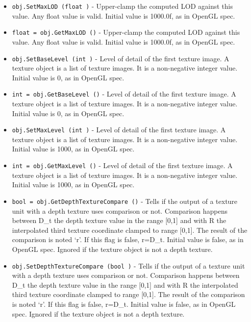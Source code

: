 \begin{itemize}
\item  \verb|obj.SetMaxLOD (float )| -  Upper-clamp the computed LOD against this value. Any float value is valid.
 Initial value is 1000.0f, as in OpenGL spec.

\item  \verb|float = obj.GetMaxLOD ()| -  Upper-clamp the computed LOD against this value. Any float value is valid.
 Initial value is 1000.0f, as in OpenGL spec.

\item  \verb|obj.SetBaseLevel (int )| -  Level of detail of the first texture image. A texture object is a list of
 texture images. It is a non-negative integer value.
 Initial value is 0, as in OpenGL spec.

\item  \verb|int = obj.GetBaseLevel ()| -  Level of detail of the first texture image. A texture object is a list of
 texture images. It is a non-negative integer value.
 Initial value is 0, as in OpenGL spec.

\item  \verb|obj.SetMaxLevel (int )| -  Level of detail of the first texture image. A texture object is a list of
 texture images. It is a non-negative integer value.
 Initial value is 1000, as in OpenGL spec.

\item  \verb|int = obj.GetMaxLevel ()| -  Level of detail of the first texture image. A texture object is a list of
 texture images. It is a non-negative integer value.
 Initial value is 1000, as in OpenGL spec.

\item  \verb|bool = obj.GetDepthTextureCompare ()| -  Tells if the output of a texture unit with a depth texture uses
 comparison or not.
 Comparison happens between D\_t the depth texture value in the range [0,1]
 and with R the interpolated third texture coordinate clamped to range
 [0,1]. The result of the comparison is noted `r'. If this flag is false,
 r=D\_t.
 Initial value is false, as in OpenGL spec.
 Ignored if the texture object is not a depth texture.

\item  \verb|obj.SetDepthTextureCompare (bool )| -  Tells if the output of a texture unit with a depth texture uses
 comparison or not.
 Comparison happens between D\_t the depth texture value in the range [0,1]
 and with R the interpolated third texture coordinate clamped to range
 [0,1]. The result of the comparison is noted `r'. If this flag is false,
 r=D\_t.
 Initial value is false, as in OpenGL spec.
 Ignored if the texture object is not a depth texture.


\end{itemize}
